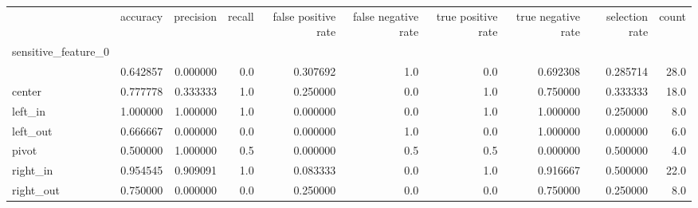 \begin{tabular}{lrrrrrrrrr}
\toprule
{} &  accuracy &  precision &  recall &  false positive rate &  false negative rate &  true positive rate &  true negative rate &  selection rate &  count \\
sensitive\_feature\_0 &           &            &         &                      &                      &                     &                     &                 &        \\
\midrule
                    &  0.642857 &   0.000000 &     0.0 &             0.307692 &                  1.0 &                 0.0 &            0.692308 &        0.285714 &   28.0 \\
center              &  0.777778 &   0.333333 &     1.0 &             0.250000 &                  0.0 &                 1.0 &            0.750000 &        0.333333 &   18.0 \\
left\_in             &  1.000000 &   1.000000 &     1.0 &             0.000000 &                  0.0 &                 1.0 &            1.000000 &        0.250000 &    8.0 \\
left\_out            &  0.666667 &   0.000000 &     0.0 &             0.000000 &                  1.0 &                 0.0 &            1.000000 &        0.000000 &    6.0 \\
pivot               &  0.500000 &   1.000000 &     0.5 &             0.000000 &                  0.5 &                 0.5 &            0.000000 &        0.500000 &    4.0 \\
right\_in            &  0.954545 &   0.909091 &     1.0 &             0.083333 &                  0.0 &                 1.0 &            0.916667 &        0.500000 &   22.0 \\
right\_out           &  0.750000 &   0.000000 &     0.0 &             0.250000 &                  0.0 &                 0.0 &            0.750000 &        0.250000 &    8.0 \\
\bottomrule
\end{tabular}
